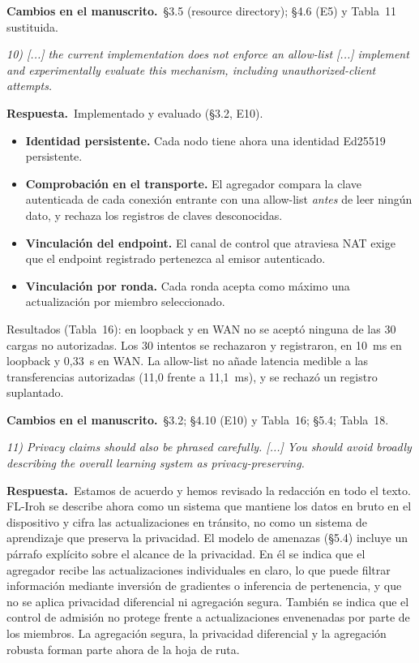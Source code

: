 \documentclass[11pt,a4paper]{article}
\newenvironment{comment}{\par\medskip\noindent\begin{minipage}{\linewidth}\color{blue!45!black}\itshape}{\end{minipage}\par}
\newcommand{\reply}{\par\smallskip\noindent\textbf{Respuesta.}~}
\newcommand{\changes}{\par\smallskip\noindent\textbf{Cambios en el manuscrito.}~}
\begin{document}
\changes \S3.5 (resource directory); \S4.6 (E5) y Tabla~11 sustituida.

\begin{comment}
10) [...] the current implementation does not enforce an allow-list [...] implement and experimentally evaluate this mechanism, including unauthorized-client attempts.
\end{comment}
\reply Implementado y evaluado (\S3.2, E10).
\begin{itemize}[leftmargin=1.3em,itemsep=0.1em]
\item \textbf{Identidad persistente.} Cada nodo tiene ahora una identidad Ed25519 persistente.
\item \textbf{Comprobación en el transporte.} El agregador compara la clave autenticada de cada conexión entrante con una allow-list \emph{antes} de leer ningún dato, y rechaza los registros de claves desconocidas.
\item \textbf{Vinculación del endpoint.} El canal de control que atraviesa NAT exige que el endpoint registrado pertenezca al emisor autenticado.
\item \textbf{Vinculación por ronda.} Cada ronda acepta como máximo una actualización por miembro seleccionado.
\end{itemize}
Resultados (Tabla~16): en loopback y en WAN no se aceptó ninguna de las 30 cargas no autorizadas. Los 30 intentos se rechazaron y registraron, en 10~ms en loopback y 0,33~s en WAN. La allow-list no añade latencia medible a las transferencias autorizadas (11,0 frente a 11,1~ms), y se rechazó un registro suplantado.

\changes \S3.2; \S4.10 (E10) y Tabla~16; \S5.4; Tabla~18.

\begin{comment}
11) Privacy claims should also be phrased carefully. [...] You should avoid broadly describing the overall learning system as privacy-preserving.
\end{comment}
\reply Estamos de acuerdo y hemos revisado la redacción en todo el texto. FL-Iroh se describe ahora como un sistema que mantiene los datos en bruto en el dispositivo y cifra las actualizaciones en tránsito, no como un sistema de aprendizaje que preserva la privacidad. El modelo de amenazas (\S5.4) incluye un párrafo explícito sobre el alcance de la privacidad. En él se indica que el agregador recibe las actualizaciones individuales en claro, lo que puede filtrar información mediante inversión de gradientes o inferencia de pertenencia, y que no se aplica privacidad diferencial ni agregación segura. También se indica que el control de admisión no protege frente a actualizaciones envenenadas por parte de los miembros. La agregación segura, la privacidad diferencial y la agregación robusta forman parte ahora de la hoja de ruta.
\end{document}
